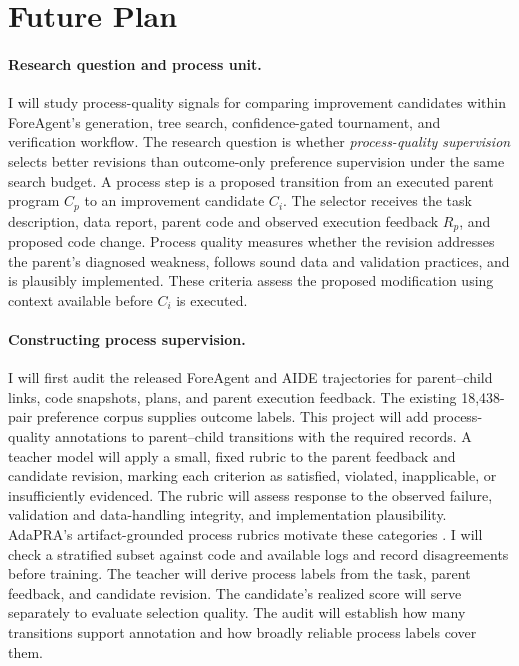 \section{Future Plan}
\label{sec:future}

\paragraph{Research question and process unit.}
I will study process-quality signals for comparing improvement candidates within ForeAgent's generation, tree search, confidence-gated tournament, and verification workflow. The research question is whether \emph{process-quality supervision} selects better revisions than outcome-only preference supervision under the same search budget. A process step is a proposed transition from an executed parent program $C_p$ to an improvement candidate $C_i$. The selector receives the task description, data report, parent code and observed execution feedback $R_p$, and proposed code change. Process quality measures whether the revision addresses the parent's diagnosed weakness, follows sound data and validation practices, and is plausibly implemented. These criteria assess the proposed modification using context available before $C_i$ is executed.

\paragraph{Constructing process supervision.}
I will first audit the released ForeAgent and AIDE trajectories for parent--child links, code snapshots, plans, and parent execution feedback. The existing 18,438-pair preference corpus supplies outcome labels. This project will add process-quality annotations to parent--child transitions with the required records. A teacher model will apply a small, fixed rubric to the parent feedback and candidate revision, marking each criterion as satisfied, violated, inapplicable, or insufficiently evidenced. The rubric will assess response to the observed failure, validation and data-handling integrity, and implementation plausibility. AdaPRA's artifact-grounded process rubrics motivate these categories \citep{naik2026adapra}. I will check a stratified subset against code and available logs and record disagreements before training. The teacher will derive process labels from the task, parent feedback, and candidate revision. The candidate's realized score will serve separately to evaluate selection quality. The audit will establish how many transitions support annotation and how broadly reliable process labels cover them.

